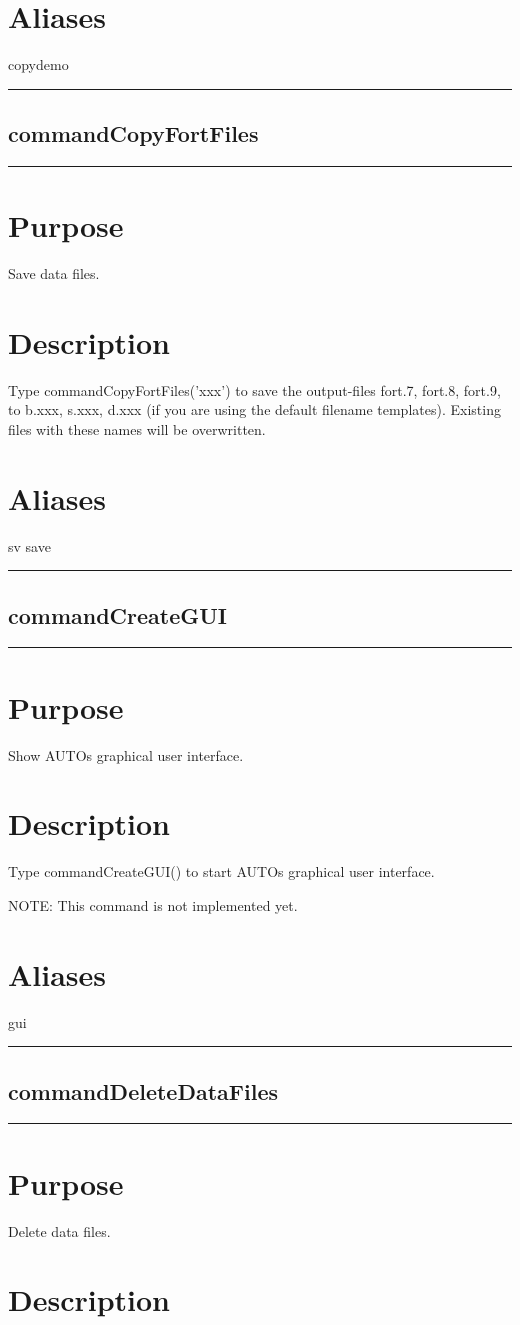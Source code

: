 \documentclass[12pt]{report}
\begin{document}
\begin{minipage}{6in}
    \section*{Aliases}
copydemo \medskip\hrule\end{minipage}\subsection{commandCopyFortFiles} \label{sec:clui_ref_commandCopyFortFiles}\begin{minipage}{6in}\hrule\medskip\section*{Purpose}
Save data files.\section*{Description}

    Type commandCopyFortFiles('xxx') to save the output-files fort.7, fort.8, fort.9,
    to b.xxx, s.xxx, d.xxx (if you are using the default filename
    templates).  Existing files with these names will be overwritten.
    \section*{Aliases}
sv save \medskip\hrule\end{minipage}\subsection{commandCreateGUI} \label{sec:clui_ref_commandCreateGUI}\begin{minipage}{6in}\hrule\medskip\section*{Purpose}
Show AUTOs graphical user interface.\section*{Description}

    Type commandCreateGUI() to start AUTOs graphical user interface.
    
    NOTE: This command is not implemented yet.
    \section*{Aliases}
gui \medskip\hrule\end{minipage}\subsection{commandDeleteDataFiles} \label{sec:clui_ref_commandDeleteDataFiles}\begin{minipage}{6in}\hrule\medskip\section*{Purpose}
Delete data files.\section*{Description}


\end{minipage}
\end{document}
